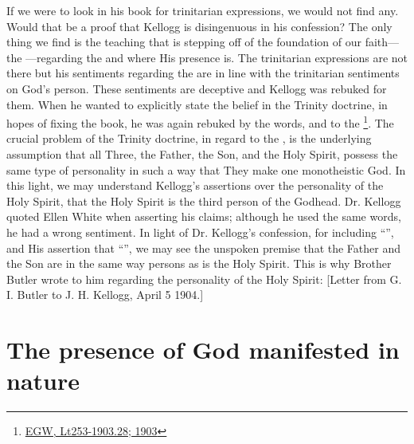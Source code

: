 If we were to look in his book for trinitarian expressions, we would not find any. Would that be a proof that Kellogg is disingenuous in his confession? The only thing we find is the teaching that is stepping off of the foundation of our faith—the —regarding the  and where His presence is. The trinitarian expressions are not there but his sentiments regarding the  are in line with the trinitarian sentiments on God’s person. These sentiments are deceptive and Kellogg was rebuked for them. When he wanted to explicitly state the belief in the Trinity doctrine, in hopes of fixing the book, he was again rebuked by the words,  and to the \footnote{\href{https://egwwritings.org/?ref=en_Lt253-1903.28&para=9980.36}{EGW, Lt253-1903.28; 1903}}. The crucial problem of the Trinity doctrine, in regard to the , is the underlying assumption that all Three, the Father, the Son, and the Holy Spirit, possess the same type of personality in such a way that They make one monotheistic God. In this light, we may understand Kellogg's assertions over the personality of the Holy Spirit, that the Holy Spirit is the third person of the Godhead. Dr. Kellogg quoted Ellen White when asserting his claims; although he used the same words, he had a wrong sentiment. In light of Dr. Kellogg’s confession, for including “”, and His assertion that “”, we may see the unspoken premise that the Father and the Son are in the same way persons as is the Holy Spirit. This is why Brother Butler wrote to him regarding the personality of the Holy Spirit: [Letter from G. I. Butler to J. H. Kellogg, April 5 1904.]

\section*{The presence of God manifested in nature}

